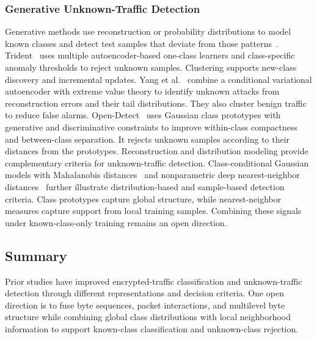 \documentclass[journal]{IEEEtran}
\newcommand{\bluecite}[1]{\textcolor{blue}{\cite{#1}}}
\begin{document}
\subsubsection{Generative Unknown-Traffic Detection}
Generative methods use reconstruction or probability distributions to model known classes and detect test samples that deviate from those patterns~\bluecite{c2ae}. Trident~\bluecite{ch2-13} uses multiple autoencoder-based one-class learners and class-specific anomaly thresholds to reject unknown samples. Clustering supports new-class discovery and incremental updates. Yang et al.~\bluecite{ch2-14} combine a conditional variational autoencoder with extreme value theory to identify unknown attacks from reconstruction errors and their tail distributions. They also cluster benign traffic to reduce false alarms. Open-Detect~\bluecite{ch2-15} uses Gaussian class prototypes with generative and discriminative constraints to improve within-class compactness and between-class separation. It rejects unknown samples according to their distances from the prototypes. Reconstruction and distribution modeling provide complementary criteria for unknown-traffic detection. Class-conditional Gaussian models with Mahalanobis distances~\bluecite{classic-mahalanobis} and nonparametric deep nearest-neighbor distances~\bluecite{classic-knn} further illustrate distribution-based and sample-based detection criteria. Class prototypes capture global structure, while nearest-neighbor measures capture support from local training samples. Combining these signals under known-class-only training remains an open direction.

\subsection{Summary}
Prior studies have improved encrypted-traffic classification and unknown-traffic detection through different representations and decision criteria. One open direction is to fuse byte sequences, packet interactions, and multilevel byte structure while combining global class distributions with local neighborhood information to support known-class classification and unknown-class rejection.



\begingroup
\renewcommand{\thesubsection}{4.\arabic{subsection}}
\renewcommand{\thesubsubsection}{4.\arabic{subsection}.\arabic{subsubsection}}

\endgroup
\end{document}
